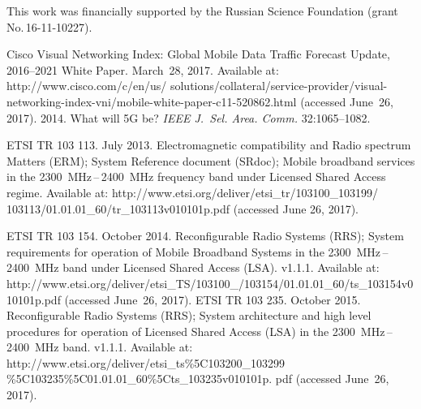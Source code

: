 


\Ack
\noindent
This work was financially supported by the Russian Science 
Foundation (grant No.\,16-11-10227).




  \begin{multicols}{2}

\renewcommand{\bibname}{\protect\rmfamily References}

{\small\frenchspacing
 {\baselineskip=10.282pt
 \begin{thebibliography}{99}
Cisco Visual Networking Index: Global Mobile Data Traffic Forecast Update, 2016--2021 White 
Paper. March~28, 2017. Available at: {\sf 
http://www.cisco.com/c/en/us/ solutions/collateral/service-provider/visual-networking-index-vni/mobile-white-paper-c11-520862.html} (accessed June~26, 2017).
 2014. What will 5G be? \textit{IEEE J.~Sel. Area. Comm.}  
32:1065--1082. 

ETSI TR 103 113. July 2013. Electromagnetic compatibility and Radio spectrum 
Matters (ERM); System 
Reference document (SRdoc); Mobile broadband services in the 2300~MHz\,--\,2400~MHz frequency 
band under Licensed Shared Access regime. Available at: {\sf 
http://www.etsi.org/deliver/etsi\_tr/103100\_103199/ 103113/01.01.01\_60/tr\_103113v010101p.pdf}  
(accessed June 26, 2017).

ETSI TR 103 154. October 2014. Reconfigurable Radio Systems (RRS); System requirements for operation of 
Mobile Broadband Systems in the 2300~MHz\,--\,2400~MHz band under Licensed Shared Access 
(LSA). v1.1.1.  Available at: {\sf 
http://www.etsi.org/deliver/etsi\_TS/103100\_/103154/01.01.01\_60/ts\_103154v010101p.pdf} (accessed June~26, 2017).
ETSI TR 103 235. October 2015. Reconfigurable Radio Systems (RRS); System architecture and high level 
procedures for operation of Licensed Shared Access (LSA) in the 
2300~MHz\,--\,2400~MHz band.
v1.1.1. Available at: {\sf 
http://www.etsi.org/deliver/etsi\_ts\%5C103200\_103299
\%5C103235\%5C01.01.01\_60\%5Cts\_103235v010101p. pdf} (accessed June~26, 2017).


\end{thebibliography}}}
\end{multicols}
